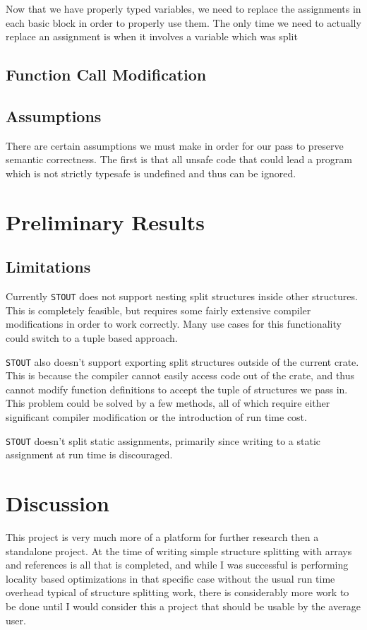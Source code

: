 \documentclass[12pt,oneside]{book}
\newcommand{\projectname}{{\texttt{STOUT}}}
\def \name{\projectname\xspace}
\begin{document}
Now that we have properly typed variables, we need to replace the assignments
in each basic block in order to properly use them. The only time we need
to actually replace an assignment is when it involves a variable which was
split

\section{Function Call Modification}
\label{sec:func}


\section{Assumptions}
There are certain assumptions we must make in order for our pass to 
preserve semantic correctness. The first is that all unsafe code that 
could lead a program which is not strictly typesafe is undefined and thus
can be ignored.

\chapter{Preliminary Results}
\section{Limitations}
\label{sec:limits}
Currently \name does not support nesting split structures inside other structures.
This is completely feasible, but requires some fairly extensive compiler
modifications in order to work correctly. Many use cases for this functionality
could switch to a tuple based approach.

\name also doesn't support exporting split structures outside of the current crate.
This is because the compiler cannot easily access code out of the crate, and
thus cannot modify function definitions to accept the tuple of structures we
pass in. This problem could be solved by a few methods, all of which require
either significant compiler modification or the introduction of run
time cost. 

\name doesn't split static assignments, primarily since writing to a static
assignment at run time is discouraged.

\chapter{Discussion}
\label{sec:discuss}

This project is very much more of a platform for further research then a
standalone project. At the time of writing simple structure splitting
with arrays and references is all that is completed, and 
while I was successful is performing locality based
optimizations in that specific case without the usual run time overhead typical of structure splitting
work, there is considerably more work to be done until I would consider this
a project that should be usable by the average user.
\end{document}
